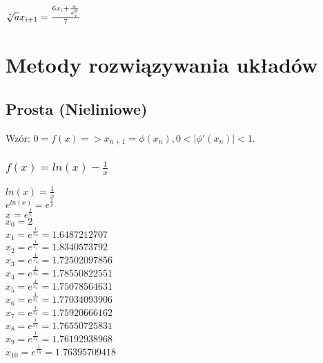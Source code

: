 \documentclass{article}
\begin{document}
$\sqrt[7]{a}\\x_{i+1}=\frac{6x_i+\frac{a}{x^6_i}}{7}$

\section{Metody rozwiązywania układów}
\subsection{Prosta (Nieliniowe)}

Wzór: $0=f(x) => x_{n+1}=\phi (x_n), 0 < |\phi '(x_n)| < 1$.

\subsubsection{$f(x)=ln(x)-\frac{1}{x}$}

$ln(x)=\frac{1}{x}$\\
$e^{ln(x)}=e^{\frac{1}{x}}$\\
$x=e^\frac{1}{x}$\\
$x_0=2$\\
$x_1=e^\frac{1}{x_0}=1.6487212707$\\
$x_2=e^\frac{1}{x_1}=1.8340573792$\\
$x_3=e^\frac{1}{x_2}=1.72502097856$\\
$x_4=e^\frac{1}{x_3}=1.78550822551$\\
$x_5=e^\frac{1}{x_4}=1.75078564631$\\
$x_6=e^\frac{1}{x_5}=1.77034093906$\\
$x_7=e^\frac{1}{x_6}=1.75920666162$\\
$x_8=e^\frac{1}{x_7}=1.76550725831$\\
$x_9=e^\frac{1}{x_8}=1.76192938968$\\
$x_{10}=e^\frac{1}{x_9}=1.76395709418$\\
\end{document}
